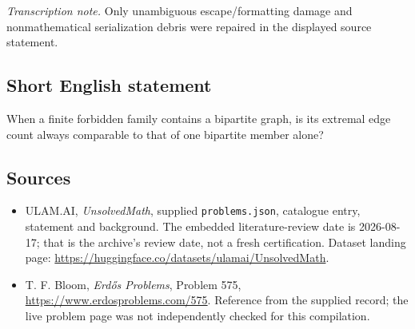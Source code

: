 \documentclass[11pt,a4paper]{article}
\begin{document}
{\small\emph{Transcription note.} Only unambiguous escape/formatting damage and nonmathematical serialization debris were repaired in the displayed source statement.}

\subsection{Short English statement}

When a finite forbidden family contains a bipartite graph, is its extremal edge count always comparable to that of one bipartite member alone?

\subsection{Sources}

{\small

\begin{itemize}

\item[\hypertarget{source:statement:1}{S1}] ULAM.AI, \emph{UnsolvedMath}, supplied \texttt{problems.json}, catalogue entry, statement and background. The embedded literature-review date is 2026-08-17; that is the archive’s review date, not a fresh certification. Dataset landing page: \url{https://huggingface.co/datasets/ulamai/UnsolvedMath}.

\item[\hypertarget{source:statement:2}{S2}] T. F. Bloom, \emph{Erdős Problems}, Problem 575, \url{https://www.erdosproblems.com/575}. Reference from the supplied record; the live problem page was not independently checked for this compilation.

\end{itemize}

}

\label{end:statement}
\end{document}
